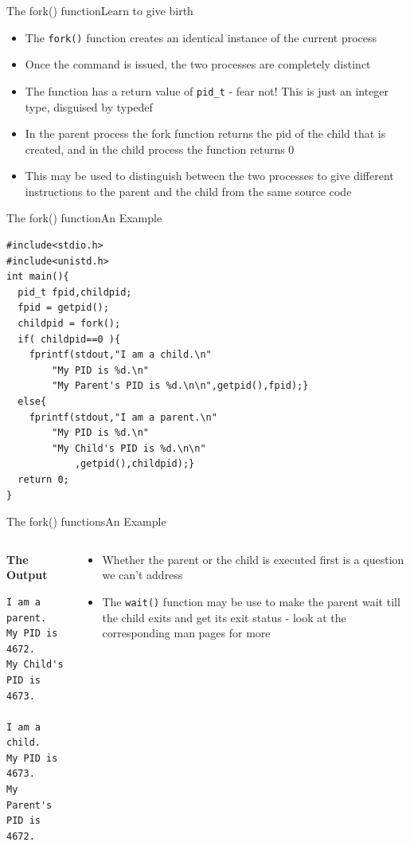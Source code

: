 \documentclass{beamer}
\begin{document}
\begin{frame}[fragile]{The fork() function}{Learn to give birth}
  \begin{itemize}
    \item The \verb|fork()| function creates an identical instance of
      the current process
    \item Once the command is issued, the two processes are completely
      distinct
    \item The function has a return value of \verb|pid_t| - fear not!
      This is just an integer type, disguised by typedef
    \item In the parent process the fork function returns the pid of
      the child that is created, and in the child process the function
      returns 0
    \item This may be used to distinguish between the two processes to
      give different instructions to the parent and the child from the
      same source code
  \end{itemize}
\end{frame}

\begin{frame}[fragile]{The fork() function}{An Example}
\begin{verbatim}
#include<stdio.h>
#include<unistd.h>
int main(){
  pid_t fpid,childpid;
  fpid = getpid();
  childpid = fork();
  if( childpid==0 ){
    fprintf(stdout,"I am a child.\n"
	    "My PID is %d.\n"
	    "My Parent's PID is %d.\n\n",getpid(),fpid);}
  else{
    fprintf(stdout,"I am a parent.\n"
	    "My PID is %d.\n"
	    "My Child's PID is %d.\n\n"
            ,getpid(),childpid);}
  return 0;
}   
\end{verbatim}
\end{frame}

\begin{frame}[fragile]{The fork() functions}{An Example}
  \begin{columns}
    \begin{column}{0.5\textwidth}
        \textbf{The Output}
\begin{verbatim}
I am a parent.
My PID is 4672.
My Child's PID is 4673.

I am a child.
My PID is 4673.
My Parent's PID is 4672.

\end{verbatim}
    \end{column}
    \begin{column}{0.5\textwidth}
      \begin{itemize}
        \item Whether the parent or the child is executed first is a
          question we can't address 
        \item The \verb|wait()| function may be use to make the parent
          wait till the child exits and get its exit status - look at
          the corresponding man pages for more
      \end{itemize}
    \end{column}
  \end{columns}
\end{frame}
\end{document}
